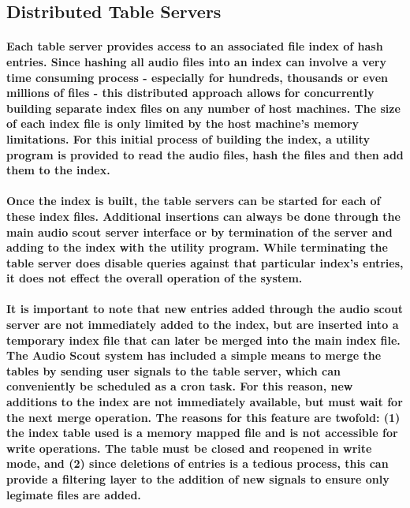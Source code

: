 \documentclass[11pt, a4paper]{article}
\begin{document}
\subsection{Distributed Table Servers}
\paragraph{Each table server provides access to an associated file index of hash entries.  Since hashing all 
audio files into an index can involve a very time consuming process - especially for hundreds, 
thousands or even millions of files - this distributed approach allows for concurrently building 
separate index files on any number of host machines.  The size of each index file is only limited 
by the host machine's memory limitations.  For this initial process of building the index,  a 
utility program is provided to read the audio files, hash the files 
and then add them to the index.}
\paragraph{Once the index is built, the table servers can be started for 
each of these index files.  Additional insertions can always be done through the main audio scout 
server interface or by termination of the server and adding to the index with the utility program.
While terminating the table server does disable queries against that particular index's entries, 
it does not effect the overall operation of the system.}
\paragraph{It is important to note that new entries added through the 
audio scout server are not immediately added to the index, but are inserted into a temporary 
index file that can later be merged into the main index file.  The Audio Scout system has 
included a simple means to merge the tables by sending user signals to the table server, 
which can conveniently be scheduled as a cron task. For this reason, new additions to the index
are not immediately available, but must wait for the next merge operation.  The reasons for this
feature are twofold: (1) the index table used is a memory mapped file and is not accessible for
write operations.  The table must be closed and reopened in write mode, and (2)
 since deletions of entries is a tedious process, this can provide a
filtering layer to the addition of new signals to ensure only legimate files are added.}
  
\end{document}
